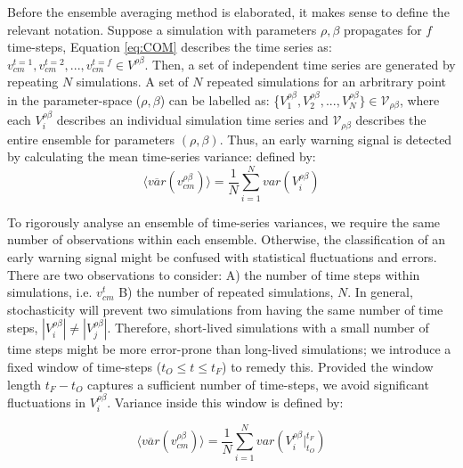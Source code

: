 Before the ensemble averaging method is elaborated, it makes sense to define the relevant notation.
Suppose a simulation with parameters $\rho, \beta$ propagates for $f$ time-steps, Equation \ref{eq:COM} describes the time series as: $v_{cm}^{t=1}, v_{cm}^{t=2},..., v_{cm}^{t=f} \in V^{\rho\beta}$. 
Then, a set of independent time series are generated by repeating $N$ simulations. 
A set of $N$ repeated simulations for an arbritrary point in the parameter-space ($\rho, \beta$) 
can be labelled as: \{$V_1^{\rho\beta}, V_2^{\rho \beta},..., V_N^{\rho\beta}\} \in \mathcal{V}_{\rho\beta}$, 
where each $V_i^{\rho\beta}$ describes an individual simulation time series and $\mathcal{V}_{\rho\beta}$ describes the entire ensemble for parameters $(\rho, \beta)$. 
Thus, an early warning signal is detected by calculating the mean time-series variance:
defined by:
\begin{equation}
\label{eq:ews_eq}
    \big\langle \overline{var}(v^{\rho\beta}_{cm}) \big\rangle = \frac{1}{N}\sum\limits_{i=1}^{N} var(V_i^{\rho\beta})
\end{equation}

To rigorously analyse an ensemble of time-series variances, 
we require the same number of observations within each ensemble. 
Otherwise, the classification of an early warning signal might be confused with statistical fluctuations and errors.
There are two observations to consider: 
A) the number of time steps within simulations, i.e. $v_{cm}^{t}$ 
B) the number of repeated simulations, $N$.
In general, stochasticity will prevent two simulations from having the same number of time steps, 
$|V_i^{\rho\beta}| \neq |V_j^{\rho\beta}|$.
Therefore, short-lived simulations with a small number of time steps might be more error-prone than long-lived simulations;
we introduce a fixed window of time-steps ($t_O\leq t \leq t_F$) to remedy this.
Provided the window length $t_F-t_O$ captures a sufficient number of time-steps, we avoid significant fluctuations in $V_i^{\rho\beta}$. 
Variance inside this window is defined by:

\begin{equation}
\label{eq:ews_eq1}
    \big\langle \overline{var}(v^{\rho\beta}_{cm}) \big\rangle = \frac{1}{N}\sum\limits_{i=1}^{N} var(V_i^{\rho\beta}\Big|^{t_F}_{t_O})
\end{equation}

